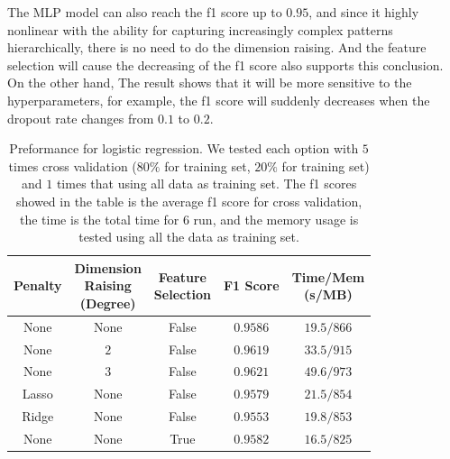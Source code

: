 \documentclass[11pt]{article}
\begin{document}
The MLP model can also reach the f1 score up to $0.95$, and since it highly nonlinear with the ability for capturing increasingly complex patterns hierarchically, there is no need to do the dimension raising. And the feature selection will cause the decreasing of the f1 score also supports this conclusion. On the other hand, The result shows that it will be more sensitive to the hyperparameters, for example, the f1 score will suddenly decreases when the dropout rate changes from $0.1$ to $0.2$.

\begin{table}[H]
  \centering
  \begin{tabular}{|c|c|c|c|c|}
    \hline
    Penalty & \makecell{Dimension                                 \\ Raising \\ (Degree)} & \makecell{Feature \\ Selection} & F1 Score & \makecell{Time/Mem \\ (s/MB)} \\
    \hline
    None    & None                & False & $0.9586$ & $19.5/866$ \\
    \hline
    None    & $2$                 & False & $0.9619$ & $33.5/915$ \\
    \hline
    None    & $3$                 & False & $0.9621$ & $49.6/973$ \\
    \hline
    Lasso   & None                & False & $0.9579$ & $21.5/854$ \\
    \hline
    Ridge   & None                & False & $0.9553$ & $19.8/853$ \\
    \hline
    None    & None                & True  & $0.9582$ & $16.5/825$ \\
    \hline
  \end{tabular}
  \caption{Preformance for logistic regression. We tested each option with $5$ times cross validation ($80\%$ for training set, $20\%$ for training set) and $1$ times that using all data as training set. The f1 scores showed in the table is the average f1 score for cross validation, the time is the total time for $6$ run, and the memory usage is tested using all the data as training set.}
  \label{task-3-result-1}
\end{table}
\end{document}
